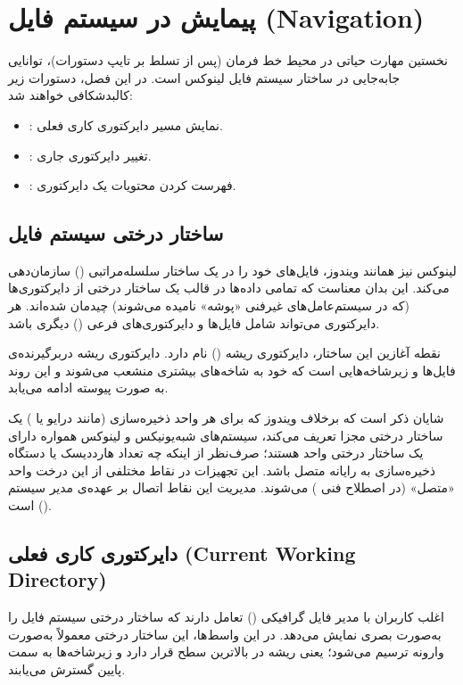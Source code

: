 \chapter{پیمایش در سیستم فایل (Navigation)}

نخستین مهارت حیاتی در محیط خط فرمان (پس از تسلط بر تایپ دستورات)، توانایی جابه‌جایی در ساختار سیستم فایل لینوکس است. در این فصل، دستورات زیر کالبدشکافی خواهند شد:

\begin{itemize}
  \item {}: نمایش مسیر دایرکتوری کاری فعلی.
  \item {}: تغییر دایرکتوری جاری.
  \item {}: فهرست کردن محتویات یک دایرکتوری.
\end{itemize}

\section{ساختار درختی سیستم فایل}

لینوکس نیز همانند ویندوز، فایل‌های خود را در یک ساختار سلسله‌مراتبی () سازمان‌دهی می‌کند. این بدان معناست که تمامی داده‌ها در قالب یک ساختار درختی از دایرکتوری‌ها (که در سیستم‌عامل‌های غیرفنی «پوشه» نامیده می‌شوند) چیدمان شده‌اند. هر دایرکتوری می‌تواند شامل فایل‌ها و دایرکتوری‌های فرعی () دیگری باشد.

نقطه آغازین این ساختار، دایرکتوری ریشه () نام دارد. دایرکتوری ریشه دربرگیرنده‌ی فایل‌ها و زیرشاخه‌هایی است که خود به شاخه‌های بیشتری منشعب می‌شوند و این روند به صورت پیوسته ادامه می‌یابد.

شایان ذکر است که برخلاف ویندوز که برای هر واحد ذخیره‌سازی (مانند درایو  یا ) یک ساختار درختی مجزا تعریف می‌کند، سیستم‌های شبه‌یونیکس و لینوکس همواره دارای یک ساختار درختی واحد هستند؛ صرف‌نظر از اینکه چه تعداد هارددیسک یا دستگاه ذخیره‌سازی به رایانه متصل باشد. این تجهیزات در نقاط مختلفی از این درخت واحد «متصل» (در اصطلاح فنی ) می‌شوند. مدیریت این نقاط اتصال بر عهده‌ی مدیر سیستم () است.

\section{دایرکتوری کاری فعلی (Current Working Directory)}

اغلب کاربران با مدیر فایل گرافیکی () تعامل دارند که ساختار درختی سیستم فایل را به‌صورت بصری نمایش می‌دهد. در این واسط‌ها، این ساختار درختی معمولاً به‌صورت وارونه ترسیم می‌شود؛ یعنی ریشه در بالاترین سطح قرار دارد و زیرشاخه‌ها به سمت پایین گسترش می‌یابند.

